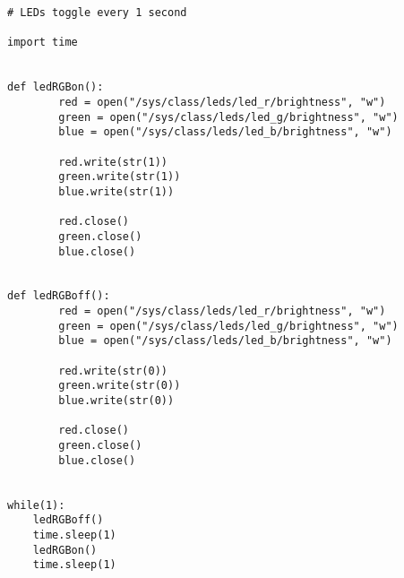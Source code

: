 \begin{verbatim}
# LEDs toggle every 1 second

import time


def ledRGBon():
        red = open("/sys/class/leds/led_r/brightness", "w")
        green = open("/sys/class/leds/led_g/brightness", "w")
        blue = open("/sys/class/leds/led_b/brightness", "w")

        red.write(str(1))
        green.write(str(1))
        blue.write(str(1))

        red.close()
        green.close()
        blue.close()


def ledRGBoff():
        red = open("/sys/class/leds/led_r/brightness", "w")
        green = open("/sys/class/leds/led_g/brightness", "w")
        blue = open("/sys/class/leds/led_b/brightness", "w")

        red.write(str(0))
        green.write(str(0))
        blue.write(str(0))

        red.close()
        green.close()
        blue.close()


while(1):
    ledRGBoff()
    time.sleep(1)
    ledRGBon()
    time.sleep(1)
\end{verbatim}


